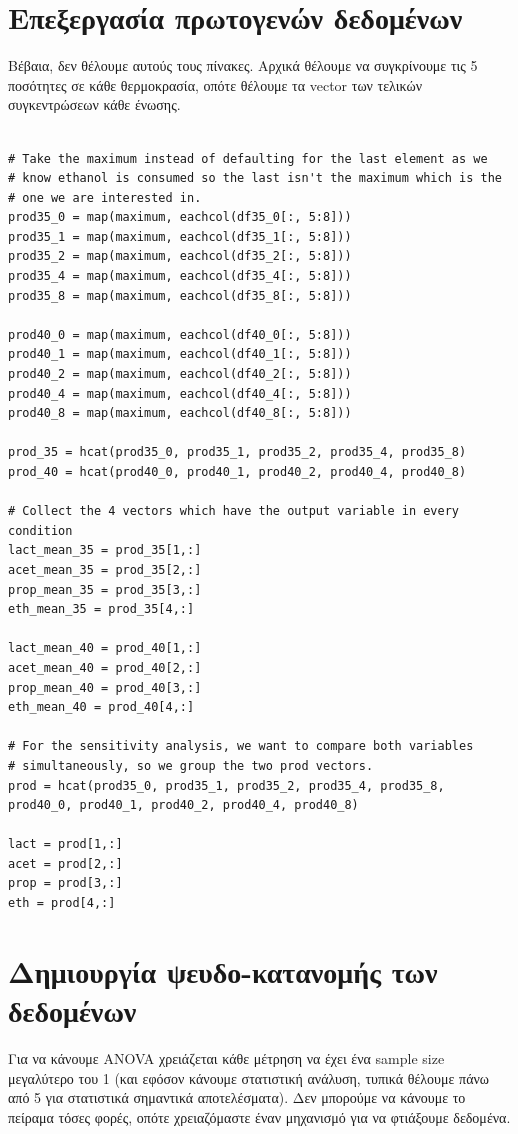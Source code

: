 \documentclass[11pt]{article}
\begin{document}
\section{Επεξεργασία πρωτογενών δεδομένων}
\label{sec:org181cd57}
Βέβαια, δεν θέλουμε αυτούς τους πίνακες. Αρχικά θέλουμε να συγκρίνουμε τις 5 ποσότητες σε κάθε θερμοκρασία, οπότε θέλουμε τα vector των τελικών συγκεντρώσεων κάθε ένωσης.

\begin{verbatim}

# Take the maximum instead of defaulting for the last element as we
# know ethanol is consumed so the last isn't the maximum which is the
# one we are interested in.
prod35_0 = map(maximum, eachcol(df35_0[:, 5:8]))
prod35_1 = map(maximum, eachcol(df35_1[:, 5:8]))
prod35_2 = map(maximum, eachcol(df35_2[:, 5:8]))
prod35_4 = map(maximum, eachcol(df35_4[:, 5:8]))
prod35_8 = map(maximum, eachcol(df35_8[:, 5:8]))

prod40_0 = map(maximum, eachcol(df40_0[:, 5:8]))
prod40_1 = map(maximum, eachcol(df40_1[:, 5:8]))
prod40_2 = map(maximum, eachcol(df40_2[:, 5:8]))
prod40_4 = map(maximum, eachcol(df40_4[:, 5:8]))
prod40_8 = map(maximum, eachcol(df40_8[:, 5:8]))

prod_35 = hcat(prod35_0, prod35_1, prod35_2, prod35_4, prod35_8)
prod_40 = hcat(prod40_0, prod40_1, prod40_2, prod40_4, prod40_8)

# Collect the 4 vectors which have the output variable in every condition
lact_mean_35 = prod_35[1,:]
acet_mean_35 = prod_35[2,:]
prop_mean_35 = prod_35[3,:]
eth_mean_35 = prod_35[4,:]

lact_mean_40 = prod_40[1,:]
acet_mean_40 = prod_40[2,:]
prop_mean_40 = prod_40[3,:]
eth_mean_40 = prod_40[4,:]

# For the sensitivity analysis, we want to compare both variables
# simultaneously, so we group the two prod vectors.
prod = hcat(prod35_0, prod35_1, prod35_2, prod35_4, prod35_8, prod40_0, prod40_1, prod40_2, prod40_4, prod40_8)

lact = prod[1,:]
acet = prod[2,:]
prop = prod[3,:]
eth = prod[4,:]
\end{verbatim}

\section{Δημιουργία ψευδο-κατανομής των δεδομένων}
\label{sec:org3f70d39}
Για να κάνουμε ANOVA χρειάζεται κάθε μέτρηση να έχει ένα sample size μεγαλύτερο του 1 (και εφόσον κάνουμε στατιστική ανάλυση, τυπικά θέλουμε πάνω από 5 για στατιστικά σημαντικά αποτελέσματα). Δεν μπορούμε να κάνουμε το πείραμα τόσες φορές, οπότε χρειαζόμαστε έναν μηχανισμό για να φτιάξουμε δεδομένα.
\end{document}
